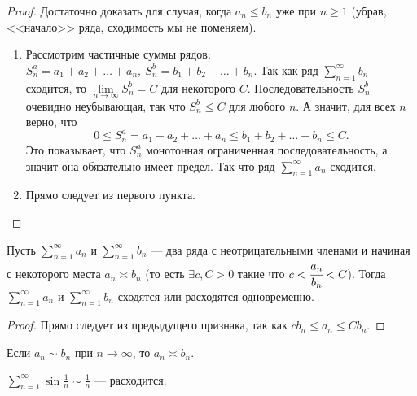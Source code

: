 \documentclass[a4paper, 12pt]{article}
\begin{document}
\begin{proof} Достаточно доказать для случая, когда $a_n \le b_n$ уже при $n \ge 1$ (убрав, <<начало>> ряда, сходимость мы не поменяем).
\begin{enumerate}
\item Рассмотрим частичные суммы рядов: $S^a_n = a_1 + a_2 + \ldots + a_n,\ S^b_n = b_1 + b_2 + \ldots + b_n.$
Так как ряд $\sum\limits_{n=1}^{\infty} b_n$ сходится, то $\lim\limits_{n\to\infty} S^b_n = C$ для некоторого $C$. Последовательность $S^b_n$ очевидно неубывающая, так что $S^b_n \le C$ для любого $n$. А значит, для всех $n$ верно, что
$$ 0 \le S^a_n = a_1 + a_2 + \ldots + a_n \le b_1 + b_2 + \ldots + b_n \le C.$$
Это показывает, что  $S^a_n$ монотонная ограниченная последовательность, а значит она обязательно имеет предел. Так что ряд $\sum\limits_{n=1}^{\infty} a_n$  сходится.
	
\item Прямо следует из первого пункта.
\end{enumerate}
\end{proof}

\begin{Test}
	Пусть $\sum\limits_{n=1}^{\infty} a_n$ и $\sum\limits_{n=1}^{\infty} b_n$ --- два ряда с неотрицательными членами и начиная с некоторого места $a_n \asymp b_n$ (то есть $\exists c, C> 0 $ такие что $c < \cfrac{a_n}{b_n}<C$). Тогда $\sum\limits_{n=1}^{\infty} a_n$ и $\sum\limits_{n=1}^{\infty} b_n$ сходятся или расходятся одновременно.
\end{Test}

\begin{proof}
	Прямо следует из предыдущего признака, так как $ cb_n \leqslant a_n\leqslant Cb_n$. 
\end{proof}
\begin{Comment}
	Если $a_n \sim b_n$ при $n \rightarrow \infty$, то $a_n \asymp b_n$.
\end{Comment}
\begin{Examples}[тривиальный]
	$\sum\limits_{n=1}^{\infty} \sin\frac{1}{n} \sim \frac{1}{n}$ --- расходится.
\end{Examples}
\end{document}
